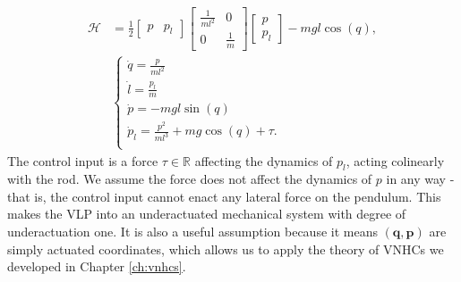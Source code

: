 \begin{align}\label{eqn:vlp-hamiltonian-with-pl}
   \mathcal{H} &= \frac{1}{2} \begin{bmatrix} p & p_l \end{bmatrix}
      \begin{bmatrix}
         \frac{1}{ml^2}  & 0 \\
         0 & \frac{1}{m}
      \end{bmatrix} \begin{bmatrix} p \\ p_l \end{bmatrix} - mgl\cos(q)
      , \\
     &\begin{cases}
        \dot{q} = \frac{p}{ml^2} \\
        \dot{l} = \frac{p_l}{m} \\
        \dot{p} = -mgl\sin(q) \\
        \dot{p}_l = \frac{p^2}{ml^3} + mg\cos(q) + \tau
        . \\
   \end{cases} \nonumber
\end{align}
The control input is a force \(\tau \in \mathbb{R}\) affecting the dynamics of
\(p_l\), acting colinearly with the rod.
We assume the force does not affect the dynamics of \(p\) in any way -
that is, the control input cannot enact any lateral force on the pendulum.
This makes the VLP into an underactuated mechanical system with degree of
underactuation one. 
It is also a useful assumption because it means \((\mathbf{q},\mathbf{p})\) 
are simply actuated coordinates, which allows us to apply the theory of VNHCs we
developed in Chapter \ref{ch:vnhcs}.

